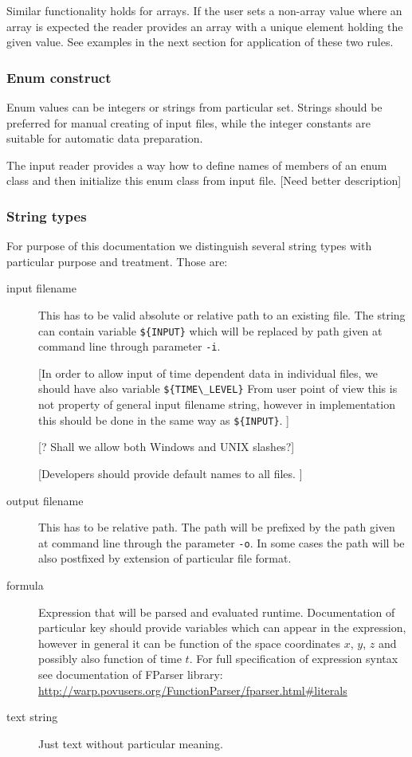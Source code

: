 Similar functionality holds for arrays. If the user sets a non-array value where an array is expected the reader provides an array with a unique element holding the given value.
See examples in the next section for application of these two rules.



\subsubsection{Enum construct}
Enum values can be integers or strings from particular set. Strings should be preferred for manual creating of input files, while 
the integer constants are suitable for automatic data preparation. 

The input reader provides a way how to define names of members of an enum class and then 
initialize this enum class from input file.  [Need better description]

\subsubsection{String types}
For purpose of this documentation we distinguish several string types with particular purpose and treatment. Those are:
\begin{description}
\item[input filename] This has to be valid absolute or relative path to an existing file. 
The string can contain variable \verb'${INPUT}' %
which will be replaced by path given at command line through parameter \verb'-i'.

[In order to allow input of  time dependent data in individual files, we should 
 have also variable \verb'${TIME\_LEVEL}' %
 From user point of view this is not property of general input filename string, however
 in implementation this should be done in the same way as \verb'${INPUT}'.
]
 
[? Shall we allow both Windows and UNIX slashes?]

[Developers should provide default names to all files. ]

\item[output filename] This has to be relative path. The path will be prefixed by
the path given at command line through the parameter \verb'-o'.
In some cases the path will be also postfixed by extension of particular file format.

\item[formula] Expression that will be parsed and evaluated runtime. Documentation of particular key should provide 
variables which can appear in the expression, however in general it can be function of the space coordinates $x$, $y$, $z$ and possibly also 
function of time $t$. For full specification of expression syntax see documentation of FParser library:
\url{http://warp.povusers.org/FunctionParser/fparser.html\#literals}

\item[text string] Just text without particular meaning.
\end{description}

